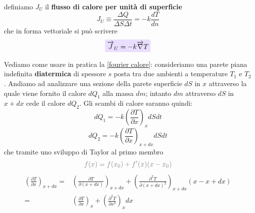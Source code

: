 \documentclass[x11names]{report}
\newcommand{\viola}[1]{\colorbox{yred}{$\displaystyle #1$}}
\begin{document}
\noindent
definiamo \(J_U\) il \textbf{flusso di calore per unità di superficie} 
\[ 
J_U \equiv \frac{\Delta Q}{\Delta S \Delta t} = - k \frac{dT}{dn}
\]
che in forma vettoriale si può scrivere
\begin{equation}
	\viola{\overrightarrow{J}_U = -k \overrightarrow{\nabla}T}
\end{equation}

\noindent
Vediamo come usare in pratica la \ref{fourier calore}: consideriamo una parete piana indefinita \textbf{diatermica} di spessore \(s\) posta tra due ambienti a temperature \(T_1\) e \(T_2\). Andiamo ad analizzare una sezione della parete superficie \(dS\) in \(x\) attraverso la quale viene fornito il calore \(dQ_1\) alla massa \(dm\); intanto \(dm\) attraverso \(dS\) in \(x + dx\) cede il calore \(dQ_2\). Gli scambi di calore saranno quindi:
\[ 
dQ_1 = -k \left(\frac{\partial T}{\partial x}\right)_x dS dt
\]
\[ 
dQ_2 = -k \left(\frac{\partial T}{\partial x}\right)_{x+dx} dS dt 
\]
che tramite uno sviluppo di Taylor al primo membro
\[ 
\textcolor{gray}{f(x) = f(x_0) + f'(x)(x-x_0)}
\]
\begin{align*}
	\left(\frac{\partial T}{\partial x}\right)_{x+dx} =& \left(\frac{\partial T}{\partial (x+dx)}\right)_{x+dx} + \left(\frac{\partial^2 T}{\partial (x + dx)^2}\right)_{x+dx}(x - x +dx) \\
	=& \left(\frac{\partial T}{\partial x}\right)_x + \left(\frac{\partial^2 T}{\partial x^2}\right)_{x}dx
\end{align*}
\end{document}
